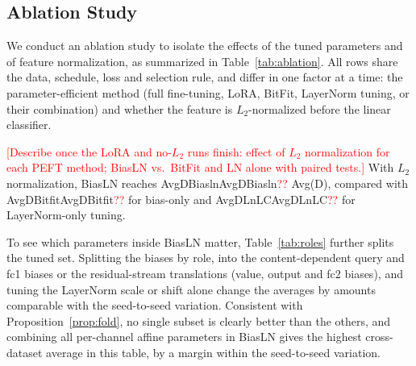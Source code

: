 \documentclass[fonts]{icst}
\newif\ifpending\pendingtrue
\newcommand{\pending}[1]{\ifpending\textcolor{red}{[#1]}\else\errmessage{pending text left: #1}\fi}
\newcommand{\num}[1]{\ifcsname #1\endcsname\csname #1\endcsname\else\textcolor{red}{??}\fi}
\begin{document}
\subsection{Ablation Study}
\label{sec:ablation}
\label{sec:roles}

We conduct an ablation study to isolate the effects of the tuned parameters and of feature normalization, as summarized in Table~\ref{tab:ablation}.
All rows share the data, schedule, loss and selection rule, and differ in one factor at a time: the parameter-efficient method (full fine-tuning, LoRA, BitFit, LayerNorm tuning, or their combination) and whether the feature is $L_2$-normalized before the linear classifier.

\begin{table}[t]
  \centering
  \captionsetup{labelsep=period, labelfont=bf, hypcap=false}
  \caption{Ablation study of PEFT variants and of $L_2$ normalization before the linear classifier, all under the protocol of Sec.~\ref{sec:protocol}. Video AUC; Avg(D) and Avg(M) are mean $\pm$ standard deviation over $n$ seeds, per-dataset values are seed means. Bold: best; shaded: second best.}
  \label{tab:ablation}
  \small
  \resizebox{0.85\textwidth}{!}{}
\end{table}

\pending{Describe once the LoRA and no-$L_2$ runs finish: effect of $L_2$ normalization for each PEFT method; BiasLN vs.\ BitFit and LN alone with paired tests.} With $L_2$ normalization, BiasLN reaches \num{AvgDBiasln} Avg(D), compared with \num{AvgDBitfit} for bias-only and \num{AvgDLnLC} for LayerNorm-only tuning.

To see which parameters inside BiasLN matter, Table~\ref{tab:roles} further splits the tuned set. Splitting the biases by role, into the content-dependent query and fc1 biases or the residual-stream translations (value, output and fc2 biases), and tuning the LayerNorm scale or shift alone change the averages by amounts comparable with the seed-to-seed variation. Consistent with Proposition~\ref{prop:fold}, no single subset is clearly better than the others, and combining all per-channel affine parameters in BiasLN gives the highest cross-dataset average in this table, by a margin within the seed-to-seed variation.

\begin{table}[t]
\centering
\captionsetup{labelsep=period, labelfont=bf, hypcap=false}
\caption{Which parameters inside BiasLN to tune ($L_2$ normalization, cross-entropy). Only the tuned subset of the encoder differs. Video AUC, mean $\pm$ std over $n$ seeds.}
\label{tab:roles}
\resizebox{\columnwidth}{!}{}
\end{table}
\end{document}
